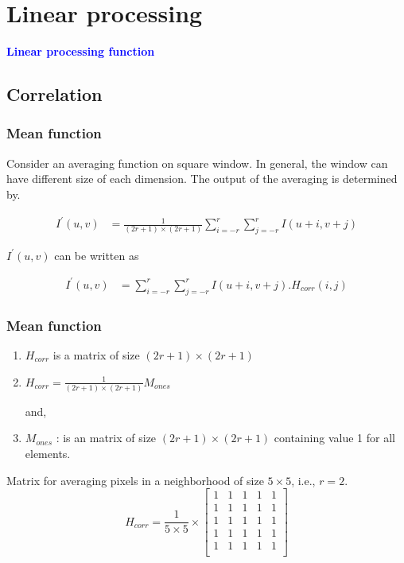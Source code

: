\documentclass[english,11pt,table,handout]{beamer}
\begin{document}
\section{Linear processing}
\frame
{
	\Huge
	\begin{center}
		\textcolor{blue}{\textbf{Linear processing function}}
	\end{center}
}

\subsection{Correlation}
\frame
{
	\frametitle{Mean function}
	Consider an averaging function on square window. In general, the window can have different size of each dimension. The output of the averaging is determined by.
	
	\begin{equation*} 
	\begin{split}
	I^{'}{(u,v)} &= \frac{1}{(2r+1) \times (2r+1)} \sum_{i=-r}^{r}{\sum_{j=-r}^{r}{I(u+i, v+j)}}
	\end{split}
	\end{equation*}
	
	$I^{'}(u,v)$ can be written as
	
	\begin{equation*} 
	\begin{split}
	I^{'}{(u,v)}	&= \sum_{i=-r}^{r}{\sum_{j=-r}^{r}{I(u+i, v+j).H_{corr}{(i,j)}}}
	\end{split}
	\end{equation*}
}
\frame
{
	\frametitle{Mean function}
	\begin{enumerate}
		\item $H_{corr}$ is a matrix of size $(2r+1) \times (2r+1)$ 
		\item $H_{corr} = \frac{1}{(2r+1) \times (2r+1)} M_{ones}$
		
		and,
		\item $M_{ones}$ : is an matrix of size $(2r+1) \times (2r+1)$ containing value 1 for all elements.
	
	\end{enumerate}
	
	\begin{example}
	Matrix for averaging pixels in a neighborhood of size $5 \times 5$, i.e., $r= 2$.
	$$
		H_{corr} = \frac{1}{5 \times 5} \times 
		\begin{bmatrix}
			1 & 1 & 1 & 1 & 1 \\
			1 & 1 & 1 & 1 & 1 \\
			1 & 1 & 1 & 1 & 1 \\
			1 & 1 & 1 & 1 & 1 \\
			1 & 1 & 1 & 1 & 1 \\
		\end{bmatrix}
	$$
	\end{example}
}
\end{document}
